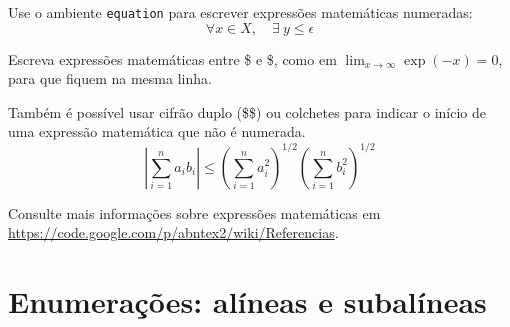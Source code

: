 \documentclass[12pt,oneside,a4paper,chapter=TITLE,
			   english,brazil]{abntex2}
\begin{document}
\begin{anexosenv}
Use o ambiente \texttt{equation} para escrever expressões matemáticas numeradas:
\begin{equation}
  \forall x \in X, \quad \exists \: y \leq \epsilon
\end{equation}

Escreva expressões matemáticas entre \$ e \$, como em $ \lim_{x \to \infty} \exp(-x) = 0 $, para que fiquem na mesma linha.

Também é possível usar cifrão duplo (\$\$) ou colchetes para indicar o início de uma expressão matemática que não é numerada.
$$
\left|\sum_{i=1}^n a_ib_i\right|
\le
\left(\sum_{i=1}^n a_i^2\right)^{1/2}
\left(\sum_{i=1}^n b_i^2\right)^{1/2}
$$

Consulte mais informações sobre expressões matemáticas em \url{https://code.google.com/p/abntex2/wiki/Referencias}.

\section{Enumerações: alíneas e subalíneas}


\end{anexosenv}
\end{document}
